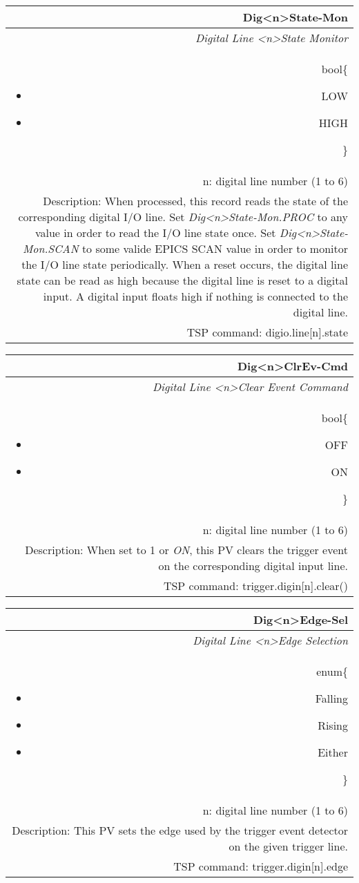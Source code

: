 \documentclass[openany]{article}
\begin{document}
		\begin{tabular}{N}
			\hline
			\bfseries Dig{\textless n\textgreater}State-Mon\label{pv:digstate-mon} \\ \hline
			\emph{Digital Line \textless n\textgreater State Monitor} \\
			bool\{\begin{itemize}[noitemsep]
				\small
				\item[] LOW
				\item[] HIGH
			\end{itemize}\} \\
			n: digital line number (1 to 6) \\
			Description: When processed, this record reads the state of the corresponding digital I/O line. Set \emph{Dig{\textless n\textgreater}State-Mon.PROC} to any value in order to read the I/O line state once. Set \emph{Dig{\textless n\textgreater}State-Mon.SCAN} to some valide EPICS SCAN value in order to monitor the I/O line state periodically. When a reset occurs, the digital line state can be read as high because the digital line is reset to a digital input. A digital input floats high if nothing is connected to the digital line. \\
			TSP command: digio.line[n].state
		\end{tabular}

		\begin{tabular}{N}
			\hline
			\bfseries Dig{\textless n\textgreater}ClrEv-Cmd\label{pv:digclrev-cmd} \\ \hline
			\emph{Digital Line \textless n\textgreater Clear Event Command} \\
			bool\{\begin{itemize}[noitemsep]
				\small
				\item[] OFF
				\item[] ON
			\end{itemize}\} \\
			n: digital line number (1 to 6) \\
			Description: When set to 1 or \emph{ON}, this PV clears the trigger event on the corresponding digital input line. \\
			TSP command: trigger.digin[n].clear()
		\end{tabular}

		\begin{tabular}{N}
			\hline
			\bfseries Dig{\textless n\textgreater}Edge-Sel\label{pv:digedge-sel} \\ \hline
			\emph{Digital Line \textless n\textgreater Edge Selection} \\
			enum\{\begin{itemize}[noitemsep]
				\small
				\item[] Falling
				\item[] Rising
				\item[] Either
			\end{itemize}\} \\
			n: digital line number (1 to 6) \\
			Description: This PV sets the edge used by the trigger event detector on the given trigger line. \\
			TSP command: trigger.digin[n].edge
		\end{tabular}
\end{document}
